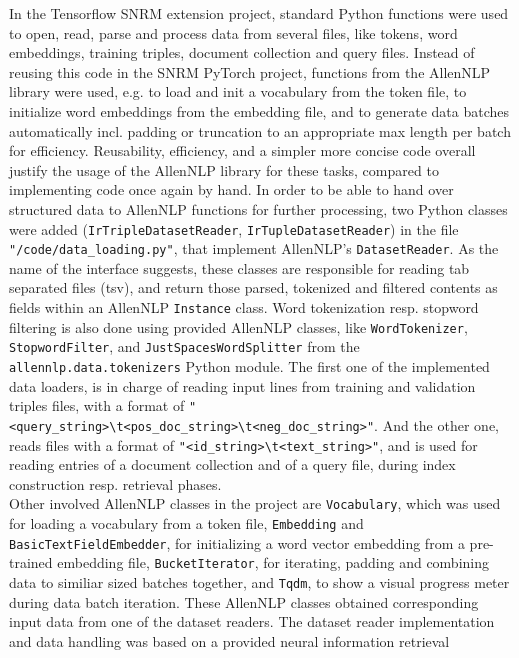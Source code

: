 In the Tensorflow SNRM extension project, standard Python functions were used 
    to open, read, parse and process data from several files, 
    like tokens, word embeddings, training triples, document collection 
    and query files.
Instead of reusing this code in the SNRM PyTorch project, functions from the
    AllenNLP library were used, e.g. to load and init a vocabulary from the token file,
    to initialize word embeddings from the embedding file,
    and to generate data batches automatically incl. padding or truncation 
    to an appropriate max length per batch for efficiency.
 Reusability, efficiency, and a simpler more concise code overall justify the usage of the 
    AllenNLP library for these tasks, compared to implementing code once again by hand.
In order to be able to hand over structured data to AllenNLP functions for further processing, 
    two Python classes were added (\texttt{IrTripleDatasetReader}, \texttt{IrTupleDatasetReader})
    in the file \texttt{"/code/data\_loading.py"}, that implement AllenNLP's \texttt{DatasetReader}.
As the name of the interface suggests, these classes are responsible for reading tab separated files (tsv),
    and return those parsed, tokenized and filtered contents as fields within an AllenNLP \texttt{Instance} class.
Word tokenization resp. stopword filtering is also done using provided AllenNLP classes, 
    like \texttt{WordTokenizer}, \texttt{StopwordFilter}, and \texttt{JustSpacesWordSplitter} from the
    \texttt{allennlp.data.tokenizers} Python module.
The first one of the implemented data loaders, is in charge of reading input lines from training and validation
    triples files, with a format of \verb|"<query_string>\t<pos_doc_string>\t<neg_doc_string>"|.
And the other one, reads files with a format of \verb|"<id_string>\t<text_string>"|, and is used for
    reading entries of a document collection and of a query file, during index construction resp. 
    retrieval phases.\\
Other involved AllenNLP classes in the project are \texttt{Vocabulary}, which was used for loading 
    a vocabulary from a token file, \texttt{Embedding} and \texttt{BasicTextFieldEmbedder}, 
    for initializing a word vector embedding from a pre-trained embedding file,
    \texttt{BucketIterator}, for iterating, padding and combining data to similiar sized batches together,
    and \texttt{Tqdm}, to show a visual progress meter during data batch iteration.
These AllenNLP classes obtained corresponding input data from one of the dataset readers.
The dataset reader implementation and data handling was based on a provided neural information retrieval 
